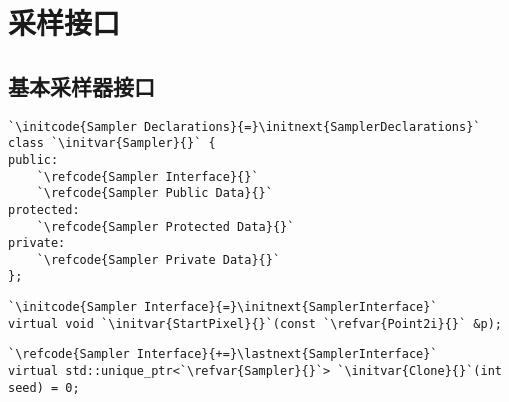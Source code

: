 \section{采样接口}\label{sec:采样接口}

\subsection{基本采样器接口}\label{sub:基本采样器接口}

\begin{lstlisting}
`\initcode{Sampler Declarations}{=}\initnext{SamplerDeclarations}`
class `\initvar{Sampler}{}` {
public:
    `\refcode{Sampler Interface}{}`
    `\refcode{Sampler Public Data}{}`
protected:
    `\refcode{Sampler Protected Data}{}`
private:
    `\refcode{Sampler Private Data}{}`
};
\end{lstlisting}

\begin{lstlisting}
`\initcode{Sampler Interface}{=}\initnext{SamplerInterface}`
virtual void `\initvar{StartPixel}{}`(const `\refvar{Point2i}{}` &p);
\end{lstlisting}

\begin{lstlisting}
`\refcode{Sampler Interface}{+=}\lastnext{SamplerInterface}`
virtual std::unique_ptr<`\refvar{Sampler}{}`> `\initvar{Clone}{}`(int seed) = 0;
\end{lstlisting}